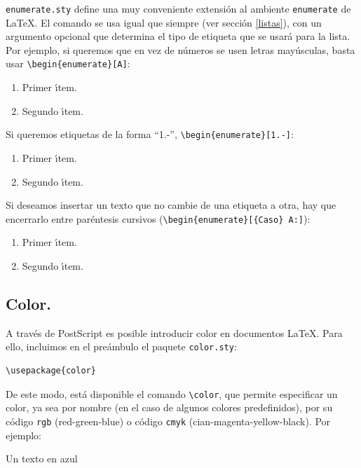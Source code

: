 {\verb+enumerate.sty+ define una muy conveniente extensi\'on al
ambiente \verb+enumerate+ de \LaTeX. El comando se usa igual que
siempre (ver secci\'on \ref{listas}), con un argumento opcional que
determina el tipo de etiqueta que se usar\'a para la lista. Por
ejemplo, si queremos que en vez de n\'umeros se usen letras
may\'usculas, basta usar \verb+\begin{enumerate}[A]+:
  \begin{enumerate}[A]
  \item Primer \'{\i}tem.
  \item Segundo \'{\i}tem.
  \end{enumerate}

Si queremos etiquetas de la forma ``1.-'', \verb+\begin{enumerate}[1.-]+:
  \begin{enumerate}[1.-]
  \item Primer \'{\i}tem.
  \item Segundo \'{\i}tem.
  \end{enumerate}

Si deseamos insertar un texto que no cambie de una etiqueta a otra,
hay que encerrarlo entre par\'entesis cursivos
(\verb+\begin{enumerate}[{Caso} A:]+):
\begin{enumerate}[{Caso} A:]
\item Primer \'{\i}tem.
\item Segundo \'{\i}tem.
\end{enumerate}

\subsection{Color.}

A trav\'es de PostScript es posible introducir color en documentos
\LaTeX. Para ello, incluimos en el pre\'ambulo el paquete
\verb+color.sty+:

\begin{verbatim}
\usepackage{color}
\end{verbatim}

De este modo, est\'a disponible el comando \verb+\color+, que permite
especificar un color, ya sea por nombre (en el caso de algunos colores
predefinidos), por su c\'odigo \verb+rgb+ (red-green-blue) o c\'odigo
\verb+cmyk+ (cian-magenta-yellow-black). Por ejemplo:

\vspace{.3cm}
{\small
\begin{minipage}[t]{5cm}
Un texto en {\color{blue} azul}


\end{minipage}}}

